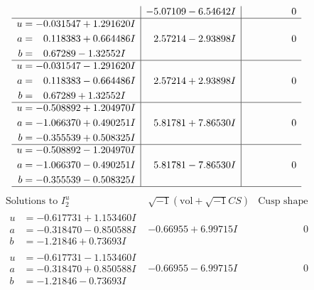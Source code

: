 \documentclass[1p]{elsarticle_modified}
\theoremstyle{definition}
\newcommand{\I}{\sqrt{-1}}
\begin{document}
$$\begin{array}{c|c|c}
 & -5.07109 - 6.54642 I & \phantom{-0.000000 } 0 \\ \hline\begin{aligned}
u &= -0.031547 + 1.291620 I \\
a &= \phantom{-}0.118383 + 0.664486 I \\
b &= \phantom{-}0.67289 - 1.32552 I\end{aligned}
 & \phantom{-}2.57214 - 2.93898 I & \phantom{-0.000000 } 0 \\ \hline\begin{aligned}
u &= -0.031547 - 1.291620 I \\
a &= \phantom{-}0.118383 - 0.664486 I \\
b &= \phantom{-}0.67289 + 1.32552 I\end{aligned}
 & \phantom{-}2.57214 + 2.93898 I & \phantom{-0.000000 } 0 \\ \hline\begin{aligned}
u &= -0.508892 + 1.204970 I \\
a &= -1.066370 + 0.490251 I \\
b &= -0.355539 + 0.508325 I\end{aligned}
 & \phantom{-}5.81781 + 7.86530 I & \phantom{-0.000000 } 0 \\ \hline\begin{aligned}
u &= -0.508892 - 1.204970 I \\
a &= -1.066370 - 0.490251 I \\
b &= -0.355539 - 0.508325 I\end{aligned}
 & \phantom{-}5.81781 - 7.86530 I & \phantom{-0.000000 } 0\\
 \hline 
 \end{array}$$\newpage$$\begin{array}{c|c|c}  
\text{Solutions to }I^u_{2}& \I (\text{vol} + \sqrt{-1}CS) & \text{Cusp shape}\\
 \hline 
\begin{aligned}
u &= -0.617731 + 1.153460 I \\
a &= -0.318470 - 0.850588 I \\
b &= -1.21846 + 0.73693 I\end{aligned}
 & -0.66955 + 6.99715 I & \phantom{-0.000000 } 0 \\ \hline\begin{aligned}
u &= -0.617731 - 1.153460 I \\
a &= -0.318470 + 0.850588 I \\
b &= -1.21846 - 0.73693 I\end{aligned}
 & -0.66955 - 6.99715 I & \phantom{-0.000000 } 0 \\ \hline\begin{aligned}

\end{aligned}
\end{array}$$
\end{document}

